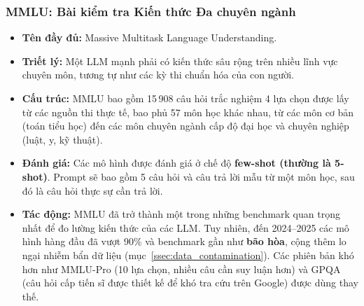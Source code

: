 \subsubsection{MMLU: Bài kiểm tra Kiến thức Đa chuyên ngành}
\begin{itemize}
    \item \textbf{Tên đầy đủ:} Massive Multitask Language Understanding.
    \item \textbf{Triết lý:} Một LLM mạnh phải có kiến thức sâu rộng trên nhiều lĩnh vực chuyên môn, tương tự như các kỳ thi chuẩn hóa của con người.
    \item \textbf{Cấu trúc:} MMLU \cite{hendrycks2021mmlu} bao gồm 15\,908 câu hỏi trắc nghiệm 4 lựa chọn được lấy từ các nguồn thi thực tế, bao phủ 57 môn học khác nhau, từ các môn cơ bản (toán tiểu học) đến các môn chuyên ngành cấp độ đại học và chuyên nghiệp (luật, y, kỹ thuật).
    \item \textbf{Đánh giá:} Các mô hình được đánh giá ở chế độ \textbf{few-shot (thường là 5-shot)}. Prompt sẽ bao gồm 5 câu hỏi và câu trả lời mẫu từ một môn học, sau đó là câu hỏi thực sự cần trả lời.
    \item \textbf{Tác động:} MMLU đã trở thành một trong những benchmark quan trọng nhất để đo lường kiến thức của các LLM. Tuy nhiên, đến 2024--2025 các mô hình hàng đầu đã vượt 90\% và benchmark gần như \textbf{bão hòa}, cộng thêm lo ngại nhiễm bẩn dữ liệu (mục~\ref{ssec:data_contamination}). Các phiên bản khó hơn như MMLU-Pro (10 lựa chọn, nhiều câu cần suy luận hơn) và GPQA (câu hỏi cấp tiến sĩ được thiết kế để khó tra cứu trên Google) được dùng thay thế.
\end{itemize}

